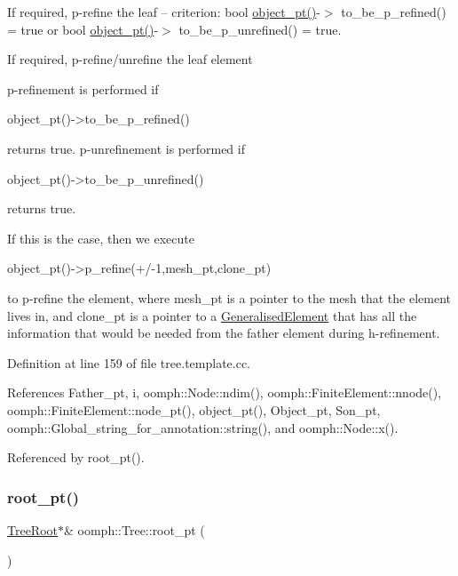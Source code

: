 If required, p-\/refine the leaf -- criterion\+: bool \hyperlink{classoomph_1_1Tree_a2f2eeb0f1dd161f696cccc652974ff4c}{object\+\_\+pt()}-\/$>$ to\+\_\+be\+\_\+p\+\_\+refined() = true or bool \hyperlink{classoomph_1_1Tree_a2f2eeb0f1dd161f696cccc652974ff4c}{object\+\_\+pt()}-\/$>$ to\+\_\+be\+\_\+p\+\_\+unrefined() = true. 

If required, p-\/refine/unrefine the leaf element

p-\/refinement is performed if \begin{DoxyVerb} object_pt()->to_be_p_refined()
\end{DoxyVerb}


returns true. p-\/unrefinement is performed if \begin{DoxyVerb} object_pt()->to_be_p_unrefined()
\end{DoxyVerb}


returns true.

If this is the case, then we execute \begin{DoxyVerb} object_pt()->p_refine(+/-1,mesh_pt,clone_pt) 
\end{DoxyVerb}


to p-\/refine the element, where mesh\+\_\+pt is a pointer to the mesh that the element lives in, and clone\+\_\+pt is a pointer to a \hyperlink{classoomph_1_1GeneralisedElement}{Generalised\+Element} that has all the information that would be needed from the father element during h-\/refinement. 

Definition at line 159 of file tree.\+template.\+cc.



References Father\+\_\+pt, i, oomph\+::\+Node\+::ndim(), oomph\+::\+Finite\+Element\+::nnode(), oomph\+::\+Finite\+Element\+::node\+\_\+pt(), object\+\_\+pt(), Object\+\_\+pt, Son\+\_\+pt, oomph\+::\+Global\+\_\+string\+\_\+for\+\_\+annotation\+::string(), and oomph\+::\+Node\+::x().



Referenced by root\+\_\+pt().

\mbox{\label{classoomph_1_1Tree_ae48479dc463d2a8f10400b4b00643a27}} 
\subsubsection{\texorpdfstring{root\+\_\+pt()}{root\_pt()}\hspace{0.1cm}{\footnotesize\ttfamily [1/2]}}
{\footnotesize\ttfamily \hyperlink{classoomph_1_1TreeRoot}{Tree\+Root}$\ast$\& oomph\+::\+Tree\+::root\+\_\+pt (\begin{DoxyParamCaption}{ }\end{DoxyParamCaption})\hspace{0.3cm}{\ttfamily [inline]}}



